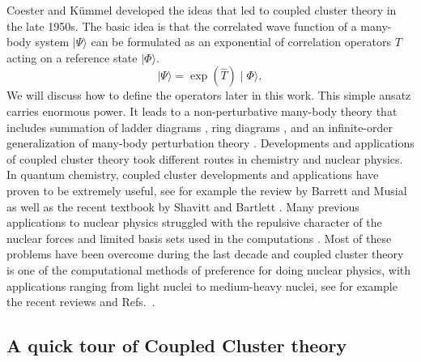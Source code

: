 Coester and K\"{u}mmel \cite{coester1958,coester1960,kuemmel1978} developed the ideas that led to coupled cluster
theory in the late 1950s. The basic idea is that the correlated wave function
of a many-body system $\mid\Psi\rangle$
can be formulated as an exponential of correlation
operators $T$ acting on a reference state $\mid\Phi\rangle$.
\begin{equation}
\mid\Psi\rangle = \exp\left(\hat{T}\right)\mid\Phi\rangle,
\end{equation}
We will discuss how to define the operators later in this work. This simple
ansatz carries enormous power. It leads to a non-perturbative many-body
theory that includes summation of ladder diagrams \cite{brueckner1955}, ring
diagrams \cite{brandow1967}, and an infinite-order
generalization of many-body perturbation theory
\cite{bartlett1981}.
Developments and applications of coupled cluster theory took
different routes in chemistry and nuclear physics. In quantum
chemistry, coupled cluster developments and applications have proven
to be extremely useful, see for example the review by Barrett and
Musial as well as the recent textbook by Shavitt and Bartlett \cite{shavittbartlett2009}.
Many previous applications to nuclear physics struggled with the
repulsive character of the nuclear forces and limited basis sets
used in the computations \cite{kuemmel1978}. Most of these problems have been overcome
during the last decade and coupled cluster theory is one of the
computational methods of preference for doing nuclear physics, with
  applications ranging from light nuclei to medium-heavy nuclei, see
  for example the recent reviews \cite{hagen2014,hagen2016} and 
Refs.~\cite{binder2013,jansen2016}. 


\subsection{A quick tour of Coupled Cluster theory}

